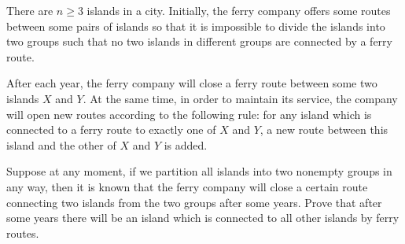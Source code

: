 There are 
$n \geq 3$
 islands in a city. Initially, the ferry company offers some routes between some pairs of islands so that it is impossible to divide the islands into two groups such that no two islands in different groups are connected by a ferry route.


After each year, the ferry company will close a ferry route between some two islands 
$X$
 and 
$Y$. 
 At the same time, in order to maintain its service, the company will open new routes according to the following rule: for any island which is connected to a ferry route to exactly one of 
$X$
 and 
$Y$, 
 a new route between this island and the other of 
$X$
 and 
$Y$
 is added.


Suppose at any moment, if we partition all islands into two nonempty groups in any way, then it is known that the ferry company will close a certain route connecting two islands from the two groups after some years. Prove that after some years there will be an island which is connected to all other islands by ferry routes.
